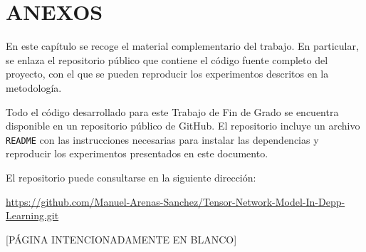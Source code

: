 \chapter{ANEXOS}\label{sec:anexos}

En este capítulo se recoge el material complementario del trabajo. En particular, se enlaza el repositorio público que contiene el código fuente completo del proyecto, con el que se pueden reproducir los experimentos descritos en la metodología.

Todo el código desarrollado para este Trabajo de Fin de Grado se encuentra disponible en un repositorio público de GitHub. El repositorio incluye un archivo \texttt{README} con las instrucciones necesarias para instalar las dependencias y reproducir los experimentos presentados en este documento.

El repositorio puede consultarse en la siguiente dirección:

\url{https://github.com/Manuel-Arenas-Sanchez/Tensor-Network-Model-In-Depp-Learning.git}

\clearpage
\thispagestyle{empty}
\vspace*{\fill}
\begin{center}
[PÁGINA INTENCIONADAMENTE EN BLANCO]
\end{center}
\vspace*{\fill}